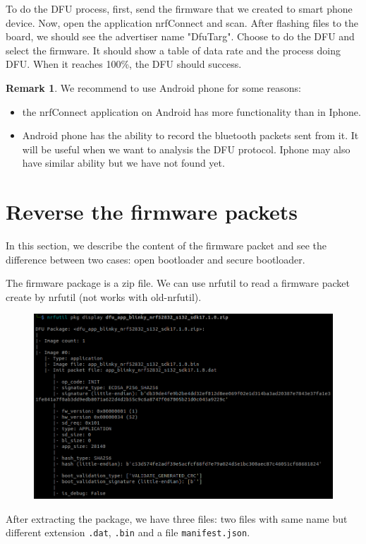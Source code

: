 \documentclass{article}
\theoremstyle{plain}
\theoremstyle{definition}
\newtheorem{remark}{Remark}
\numberwithin{equation}{section}
\begin{document}
To do the DFU process, first, send the firmware that we created to smart phone device. Now, open the application nrfConnect and scan. After flashing files to the board, we should see the advertiser name "DfuTarg". Choose to do the DFU and select the firmware. It should show a table of data rate and the process doing DFU. When it reaches 100\%, the DFU should success.

\begin{remark}\label{recommnd android}
	 We recommend to use Android phone for some reasons:
	 \begin{itemize}
	 	\item the nrfConnect application on Android has more functionality than in Iphone.
	 	\item Android phone has the ability to record the bluetooth packets sent from it. It will be useful when we want to analysis the DFU protocol. Iphone may also have similar ability but we have not found yet. 
	 \end{itemize}
\end{remark}

\section{Reverse the firmware packets}\label{reverse firmware packets}
In this section, we describe the content of the firmware packet and see the difference between two cases: open bootloader and secure bootloader.

The firmware package is a zip file. We can use nrfutil to read a firmware packet create by nrfutil (not works with old-nrfutil).

\begin{figure}[H]
	\centering
	\includegraphics[width=0.7\linewidth]{images/nrfutil-view-zip}
	\caption{}
	\label{fig:nrfutil-view-zip}
\end{figure}


After extracting the package, we have three files: two files with same name but different extension \texttt{.dat}, \texttt{.bin} and a file \texttt{manifest.json}.
\end{document}
